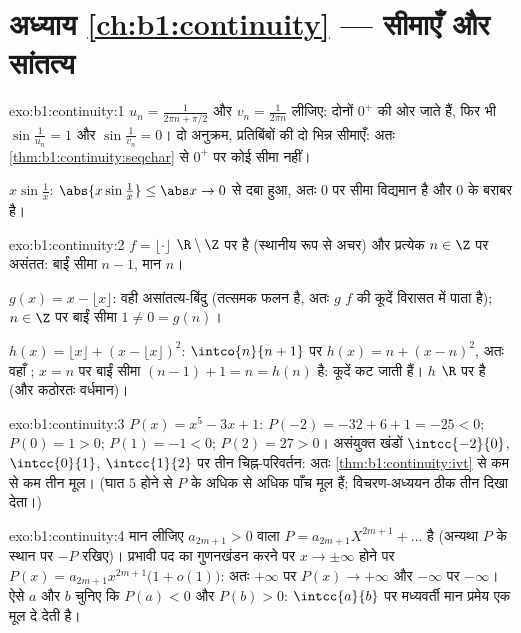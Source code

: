 \section*{अध्याय \ref{ch:b1:continuity} --- सीमाएँ और सांतत्य}

\begin{solution}{exo:b1:continuity:1}
$u_n = \frac{1}{2\pi n + \pi/2}$ और $v_n = \frac{1}{2\pi n}$ लीजिए: दोनों
$0^+$ की ओर जाते हैं, फिर भी $\sin\frac{1}{u_n} = 1$ और $\sin\frac{1}{v_n} =
0$। दो अनुक्रम, प्रतिबिंबों की दो भिन्न सीमाएँ: अतः
\cref{thm:b1:continuity:seqchar} से $0^+$ पर कोई सीमा नहीं।

$x \sin\frac1x$: $\abs{x\sin\frac1x} \leq \abs x \to 0$ से दबा हुआ, अतः $0$
पर सीमा विद्यमान है और $0$ के बराबर है।
\end{solution}

\begin{solution}{exo:b1:continuity:2}
$f = \lfloor\cdot\rfloor$ $\R \setminus \Z$ पर  है (स्थानीय रूप से अचर)
और प्रत्येक $n \in \Z$ पर असंतत: बाईं सीमा $n - 1$, मान $n$।

$g(x) = x - \lfloor x\rfloor$: वही असांतत्य-बिंदु (तत्समक फलन  है, अतः
$g$ $f$ की कूदें विरासत में पाता है); $n \in \Z$ पर बाईं सीमा $1 \neq 0 =
g(n)$।

$h(x) = \lfloor x\rfloor + (x - \lfloor x\rfloor)^2$: $\intco{n}{n + 1}$ पर
$h(x) = n + (x - n)^2$, अतः वहाँ ; $x = n$ पर बाईं सीमा $(n-1) + 1 = n =
h(n)$ है: कूदें कट जाती हैं। $h$ $\R$ पर  है (और कठोरतः वर्धमान)।
\end{solution}

\begin{solution}{exo:b1:continuity:3}
$P(x) = x^5 - 3x + 1$: $P(-2) = -32 + 6 + 1 = -25 < 0$; $P(0) = 1 > 0$;
$P(1) = -1 < 0$; $P(2) = 27 > 0$। असंयुक्त खंडों $\intcc{-2}{0}$,
$\intcc{0}{1}$, $\intcc{1}{2}$ पर तीन चिह्न-परिवर्तन: अतः
\cref{thm:b1:continuity:ivt} से कम से कम तीन मूल। (घात $5$ होने से $P$ के
अधिक से अधिक पाँच मूल हैं; विचरण-अध्ययन ठीक तीन दिखा देता।)
\end{solution}

\begin{solution}{exo:b1:continuity:4}
मान लीजिए $a_{2m+1} > 0$ वाला $P = a_{2m+1}X^{2m+1} + \dots$ है (अन्यथा $P$
के स्थान पर $-P$ रखिए)। प्रभावी पद का गुणनखंडन करने पर $x \to \pm\infty$
होने पर $P(x) = a_{2m+1} x^{2m+1}\bigl(1 + o(1)\bigr)$: अतः $+\infty$ पर
$P(x) \to +\infty$ और $-\infty$ पर $-\infty$। ऐसे $a$ और $b$ चुनिए कि $P(a)
< 0$ और $P(b) > 0$: $\intcc{a}{b}$ पर मध्यवर्ती मान प्रमेय एक मूल दे देती
है।
\end{solution}

